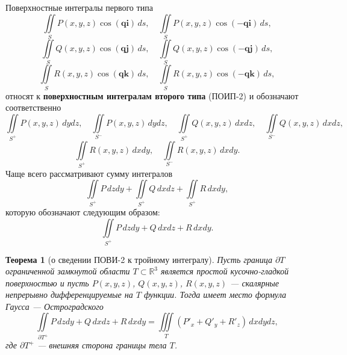 \documentclass[a4paper, 12pt]{report}
\numberwithin{equation}{section}
\newtheorem*{theorem}{Теорема}
\begin{document}
	Поверхностные интегралы первого типа
	\[
	\iint\limits_{S} P(x, y, z) \cos (\mathbf{q} \mathbf{i}) \, ds, \quad 
	\iint\limits_{S} P(x, y, z) \cos (-\mathbf{q} \mathbf{i}) \, ds,
	\]
	\[
	\iint\limits_{S} Q(x, y, z) \cos (\mathbf{q} \mathbf{j}) \, ds, \quad 
	\iint\limits_{S} Q(x, y, z) \cos (-\mathbf{q} \mathbf{j}) \, ds,
	\]
	\[
	\iint\limits_{S} R(x, y, z) \cos (\mathbf{q} \mathbf{k}) \, ds, \quad 
	\iint\limits_{S} R(x, y, z) \cos (-\mathbf{q} \mathbf{k}) \, ds,
	\]
	относят к \textbf{поверхностным интегралам второго типа} (ПОИП-2) и обозначают соответственно
	\[
	\iint\limits_{S^+} P(x, y, z) \, dy dz, \quad 
	\iint\limits_{S^-} P(x, y, z) \, dy dz, \quad 
	\iint\limits_{S^+} Q(x, y, z) \, dx dz, \quad 
	\iint\limits_{S^-} Q(x, y, z) \, dx dz,
	\]
	\[
	\iint\limits_{S^+} R(x, y, z) \, dx dy, \quad 
	\iint\limits_{S^-} R(x, y, z) \, dx dy.
	\]
	Чаще всего рассматривают сумму интегралов 
	\[
	\iint\limits_{S^+} P \, dz dy + \iint\limits_{S^+} Q \, dx dz + \iint\limits_{S^+} R \, dx dy,
	\]
	которую обозначают следующим образом:
	\[
	\iint\limits_{S^+} P \, dz dy + Q \, dx dz + R \, dx dy.
	\]
	\begin{theorem}
		[о сведении ПОВИ-2 к тройному интегралу]
		Пусть граница $\partial T$ ограниченной замкнутой области $T \subset \mathbb{R}^3$ является 
		простой кусочно-гладкой поверхностью и пусть $P(x, y, z)$, $Q(x, y, z)$, $R(x, y, z)$ — 
		скалярные непрерывно дифференцируемые на $T$ функции. Тогда имеет место формула Гаусса — Остроградского
		\[
		\iint\limits_{\partial T^+} P \, dzdy + Q \, dxdz + R \, dxdy = 
		\iiint\limits_{T} \left(P'_x + Q'_y + R'_z \right) \, dxdydz,
		\]
		где $\partial T^+$ — внешняя сторона границы тела $T$.
	\end{theorem}
	
\end{document}
